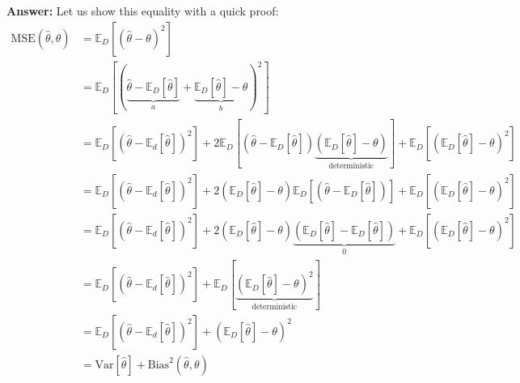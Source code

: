 \documentclass{article}
\newenvironment{QandA}{\begin{enumerate}[label=\arabic*.]}{\end{enumerate}}
\newenvironment{InnerQandA}{\begin{enumerate}[label=\roman*.]}{\end{enumerate}}
\newenvironment{answer}{\par\normalfont \textbf{Answer:}}{}
\begin{document}
\begin{QandA}
\begin{InnerQandA}
\begin{answer}
            Let us show this equality with a quick proof:
            \begin{align*}
                \text{MSE}\left(\hat{\theta}, \theta \right) &= \mathbb{E}_{D} \left[ (\hat{\theta} - \theta)^2\right] \\
                &= \mathbb{E}_{D} \left[\left(\underbrace{\hat{\theta} - \mathbb{E}_{D}\left[ \hat{\theta} \right]}_{a} + \underbrace{\mathbb{E}_{D}\left[ \hat{\theta} \right] - \theta}_{b}\right)^2\right] \\
                &= \mathbb{E}_{D} \left[ \left( \hat{\theta} - \mathbb{E}_{d}\left[ \hat{\theta} \right] \right)^2 \right] + 2 \mathbb{E}_D \left[ \left( \hat{\theta} - \mathbb{E}_D \left[ \hat{\theta} \right] \right) \underbrace{\left( \mathbb{E}_D \left[ \hat{\theta} \right] - \theta \right)}_{\text{deterministic}} \right] + \mathbb{E}_D \left[ \left( \mathbb{E}_D \left[ \hat{\theta} \right] - \theta \right)^2 \right] \\
                &= \mathbb{E}_{D} \left[ \left( \hat{\theta} - \mathbb{E}_{d}\left[ \hat{\theta} \right] \right)^2 \right] + 2 \left( \mathbb{E}_D \left[ \hat{\theta} \right] - \theta \right) \mathbb{E}_D \left[ \left( \hat{\theta} - \mathbb{E}_D \left[ \hat{\theta} \right] \right)  \right] + \mathbb{E}_D \left[ \left( \mathbb{E}_D \left[ \hat{\theta} \right] - \theta \right)^2 \right] \\
                &= \mathbb{E}_{D} \left[ \left( \hat{\theta} - \mathbb{E}_{d}\left[ \hat{\theta} \right] \right)^2 \right] + 2 \left( \mathbb{E}_D \left[ \hat{\theta} \right] - \theta \right)  \underbrace{\left( \mathbb{E}_D \left[\hat{\theta}\right] - \mathbb{E}_D \left[ \hat{\theta} \right] \right)}_{0} + \mathbb{E}_D \left[ \left( \mathbb{E}_D \left[ \hat{\theta} \right] - \theta \right)^2 \right] \\
                &= \mathbb{E}_{D} \left[ \left( \hat{\theta} - \mathbb{E}_{d}\left[ \hat{\theta} \right] \right)^2 \right] + \mathbb{E}_D \left[ \underbrace{ \left( \mathbb{E}_D \left[ \hat{\theta} \right] - \theta \right)^2}_{\text{deterministic}} \right] \\
                &= \mathbb{E}_{D} \left[ \left( \hat{\theta} - \mathbb{E}_{d}\left[ \hat{\theta} \right] \right)^2 \right] + \left( \mathbb{E}_D \left[ \hat{\theta} \right] - \theta \right)^2 \\
                &= \text{Var}\left[\hat{\theta}\right] + \text{Bias}^2 \left(\hat{\theta}, \theta \right)
            \end{align*}


\end{answer}
\end{InnerQandA}
\end{QandA}
\end{document}

